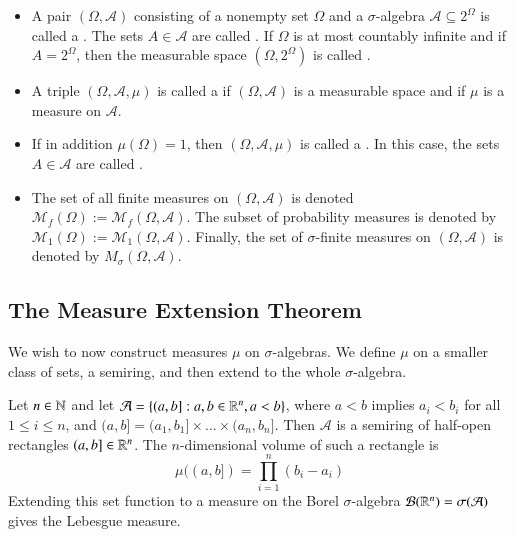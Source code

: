 \documentclass[12pt, a4paper, oneside, openright, titlepage]{book}
\begin{document}
\begin{defn}
    \leavevmode
    \begin{itemize}
        \item A pair $(\Omega,\mathcal{A})$ consisting of a nonempty set $\Omega$ and a $\sigma$-algebra $\mathcal{A}\subseteq 2^{\Omega}$ is called a . The sets $A \in \mathcal{A}$ are called . If $\Omega$ is at most countably infinite and if $A = 2^{\Omega}$, then the measurable space $(\Omega,2^{\Omega})$ is called .
        \item A triple $(\Omega,\mathcal{A},\mu)$ is called a  if $(\Omega,\mathcal{A})$ is a measurable space and if $\mu$ is a measure on $\mathcal{A}$.
        \item If in addition $\mu(\Omega) = 1$, then $(\Omega,\mathcal{A},\mu)$ is called a . In this case, the sets $A \in \mathcal{A}$ are called .
        \item The set of all finite measures on $(\Omega,\mathcal{A})$ is denoted $\mathcal{M}_f(\Omega) := \mathcal{M}_f(\Omega,\mathcal{A})$. The subset of probability measures is denoted by $\mathcal{M}_1(\Omega) := \mathcal{M}_1(\Omega, \mathcal{A})$. Finally, the set of $\sigma$-finite measures on $(\Omega,\mathcal{A})$ is denoted by $M_{\sigma}(\Omega,\mathcal{A})$.
    \end{itemize}
\end{defn}


\subsection{The Measure Extension Theorem}

We wish to now construct measures $\mu$ on $\sigma$-algebras. We define $\mu$ on a smaller class of sets, a semiring, and then extend to the whole $\sigma$-algebra.

\begin{eg}
    Let $n \in \mathbb N$ and let $\mathcal{A} = \{(a,b]:a,b \in \mathbb R^n, a < b\}$, where $a < b$ implies $a_i < b_i$ for all $1 \leq i \leq n$, and $(a,b] = (a_1,b_1]\times ... \times (a_n,b_n]$. Then $\mathcal{A}$ is a semiring of half-open rectangles $(a,b] \in \mathbb R^n$. The $n$-dimensional volume of such a rectangle is \begin{equation*}
        \mu((a,b]) = \prod_{i=1}^n(b_i - a_i)
    \end{equation*}
    Extending this set function to a measure on the Borel $\sigma$-algebra $\mathcal{B}(\mathbb R^n) = \sigma(\mathcal{A})$ gives the Lebesgue measure.
\end{eg}
\end{document}
